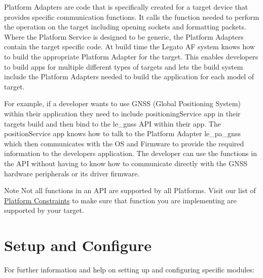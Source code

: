 Platform Adapters are code that is specifically created for a target device that provides specific communication functions. It calls the function needed to perform the operation on the target including opening sockets and formatting packets. Where the Platform Service is designed to be generic, the Platform Adapters contain the target specific code. At build time the Legato AF system knows how to build the appropriate Platform Adapter for the target. This enables developers to build apps for multiple different types of targets and lets the build system include the Platform Adapters needed to build the application for each model of target.



For example, if a developer wants to use G\+N\+SS (Global Positioning System) within their application they need to include {\ttfamily positioning\+Service} app in their target\textquotesingle{}s build and then bind to the {\ttfamily le\+\_\+gnss} A\+PI within their app. The {\ttfamily position\+Service} app knows how to talk to the Platform Adapter {\ttfamily le\+\_\+pa\+\_\+gnss} which then communicates with the OS and Firmware to provide the required information to the developers application. The developer can use the functions in the A\+PI without having to know how to communicate directly with the G\+N\+SS hardware peripherals or it\textquotesingle{}s driver firmware.

\begin{DoxyNote}{Note}
Not all functions in an A\+PI are supported by all Platforms. Visit our list of \hyperlink{platformConstraints}{Platform Constraints} to make sure that function you are implementing are supported by your target.
\end{DoxyNote}
\section*{Setup and Configure }

For further information and help on setting up and configuring specific modules\+:

